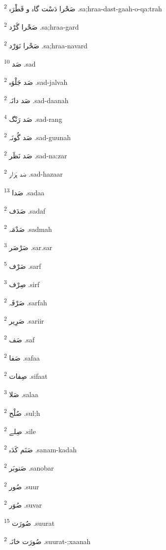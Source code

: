 \documentclass[12pt]{article}
\begin{document}
\begin{RTL}
\begin{multicols}{5}
{\ur صَحْرا دَسْت گاہ و قَطْرَہ}   \textsuperscript{2} .sa;hraa-dast-gaah-o-qa:trah

{\ur صَحْرا گَرْد}   \textsuperscript{2} .sa;hraa-gard

{\ur صَحْرا نَوَرْد}   \textsuperscript{2} .sa;hraa-navard

{\ur صَد}   \textsuperscript{10} .sad

{\ur صَد جَلْوَہ}   \textsuperscript{2} .sad-jalvah

{\ur صَد دانَہ}   \textsuperscript{2} .sad-daanah

{\ur صَد رَنْگ}   \textsuperscript{4} .sad-rang

{\ur صَد گُونَہ}   \textsuperscript{2} .sad-guunah

{\ur صَد نَظَر}   \textsuperscript{2} .sad-na:zar

{\ur صَد ہَزار}   \textsuperscript{2} .sad-hazaar

{\ur صَدا}   \textsuperscript{13} .sadaa

{\ur صَدَف}   \textsuperscript{2} .sadaf

{\ur صَدْمَہ}   \textsuperscript{2} .sadmah

{\ur صَرْصَر}   \textsuperscript{3} .sar.sar

{\ur صَرْف}   \textsuperscript{5} .sarf

{\ur صِرْف}   \textsuperscript{3} .sirf

{\ur صَرْفَہ}   \textsuperscript{2} .sarfah

{\ur صَرِیر}   \textsuperscript{2} .sariir

{\ur صَف}   \textsuperscript{2} .saf

{\ur صَفا}   \textsuperscript{2} .safaa

{\ur صِفات}   \textsuperscript{2} .sifaat

{\ur صَلا}   \textsuperscript{3} .salaa

{\ur صُلْح}   \textsuperscript{2} .sul;h

{\ur صِلے}   \textsuperscript{2} .sile

{\ur صَنَم کَدَہ}   \textsuperscript{2} .sanam-kadah

{\ur صَنوبَر}   \textsuperscript{2} .sanobar

{\ur صُور}   \textsuperscript{2} .suur

{\ur صُوَر}   \textsuperscript{2} .suvar

{\ur صُورَت}   \textsuperscript{15} .suurat

{\ur صُورَت خانَہ}   \textsuperscript{2} .suurat-;xaanah


\end{multicols}
\end{RTL}
\end{document}
